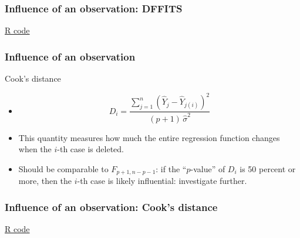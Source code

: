 \documentclass[handout]{beamer}
\begin{document}


   \begin{frame}
   \frametitle{Influence of an observation: DFFITS}
   \begin{center}
   \end{center}
   \href{http://stats191.stanford.edu/diagnostics.html#dffits}{R code}
   \end{frame}


   \begin{frame} \frametitle{Influence of an observation}

   \begin{block}
   {Cook's distance}
   \begin{itemize}[<+->]

   \item $$
   D_i = \frac{\sum_{j=1}^n(\widehat{Y}_j - \widehat{Y}_{j(i)})^2}{(p+1) \, \widehat{\sigma}^2}$$

   \item This quantity measures how much the entire regression function changes when the $i$-th case is deleted.

   \item Should be comparable to $F_{p+1,n-p-1}$: if the ``$p$-value'' of $D_i$ is 50 percent or more, then the $i$-th case is likely influential: investigate further.
   \end{itemize}

   \end{block}
   \end{frame}



   \begin{frame}
   \frametitle{Influence of an observation: Cook's distance}
   \begin{center}
   \end{center}
   \href{http://stats191.stanford.edu/diagnostics.html#cook-s-distance}{R code}
   \end{frame}

\end{document}
